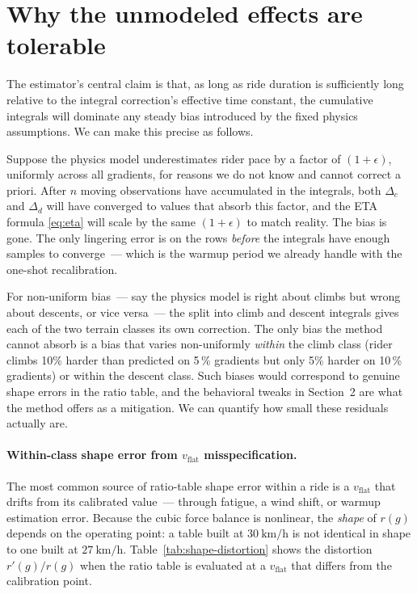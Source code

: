 \documentclass[11pt,a4paper]{article}
\begin{document}
\section{Why the unmodeled effects are tolerable}
\label{sec:tolerable}

The estimator's central claim is that, as long as ride duration is
sufficiently long relative to the integral correction's effective
time constant, the cumulative integrals will dominate any steady
bias introduced by the fixed physics assumptions. We can make this
precise as follows.

Suppose the physics model underestimates rider pace by a factor of
$(1 + \epsilon)$, uniformly across all gradients, for reasons we do
not know and cannot correct a priori. After $n$ moving observations
have accumulated in the integrals, both $\Delta_c$ and $\Delta_d$
will have converged to values that absorb this factor, and the ETA
formula \eqref{eq:eta} will scale by the same $(1 + \epsilon)$ to
match reality. The bias is gone. The only lingering error is on the
rows \emph{before} the integrals have enough samples to converge~---
which is the warmup period we already handle with the one-shot
recalibration.

For non-uniform bias~--- say the physics model is right about climbs
but wrong about descents, or vice versa~--- the split into climb and
descent integrals gives each of the two terrain classes its own
correction. The only bias the method cannot absorb is a bias that
varies non-uniformly \emph{within} the climb class (rider climbs 10\%
harder than predicted on 5\,\% gradients but only 5\% harder on
10\,\% gradients) or within the descent class. Such biases would
correspond to genuine shape errors in the ratio table, and the
behavioral tweaks in Section~2 are what the method offers as a
mitigation. We can quantify how small these residuals actually are.

\paragraph{Within-class shape error from $v_{\text{flat}}$ misspecification.}

The most common source of ratio-table shape error within a ride is a
$v_{\text{flat}}$ that drifts from its calibrated value~--- through
fatigue, a wind shift, or warmup estimation error. Because the cubic
force balance is nonlinear, the \emph{shape} of $r(g)$ depends on the
operating point: a table built at $\SI{30}{\km\per\hour}$ is not
identical in shape to one built at $\SI{27}{\km\per\hour}$.
Table~\ref{tab:shape-distortion} shows the distortion
$r'(g) / r(g)$ when the ratio table is evaluated at a
$v_{\text{flat}}$ that differs from the calibration point.
\end{document}
